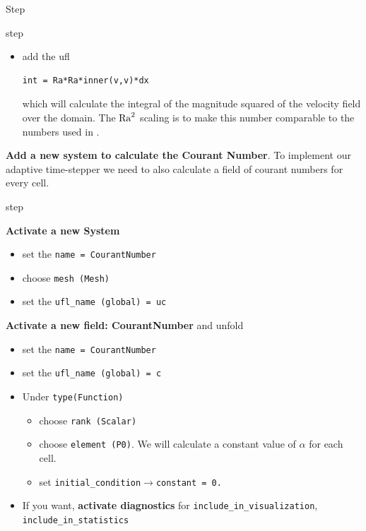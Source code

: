\begin{steps}{Step}
\begin{steps}{step}
\begin{itemize}
\begin{itemize}
      \item add the ufl
       \begin{lstlisting}[style=UFL]
int = Ra*Ra*inner(v,v)*dx
       \end{lstlisting}
 which will calculate the integral of the magnitude squared of the velocity
 field over the domain.  The $\mathrm{Ra}^{2}$ scaling is to make this number
 comparable to the numbers used in \cite{blankenbach_benchmark_1989}.
      \end{itemize}
    \end{itemize}
\end{steps}
  \item \textbf{Add a new system to calculate the Courant Number}.  To
    implement our adaptive time-stepper we need to also calculate a
    field of courant numbers for every cell.
    \begin{steps}{step}
    \item \textbf{Activate a new System} 
      \begin{itemize}
      \item set the \texttt{name = CourantNumber}
      \item choose \texttt{mesh (Mesh)}
      \item set the \texttt{ufl\_name (global) = uc}
      \end{itemize}
    \item \textbf{Activate a new field: CourantNumber} and unfold
     \begin{itemize}
      \item set the \texttt{name = CourantNumber}
      \item set the \texttt{ufl\_name (global) = c}
      \item Under \texttt{type(Function)}
        \begin{itemize}
        \item choose \texttt{rank (Scalar)}
        \item choose \texttt{element (P0)}. We will calculate a
          constant value of $\alpha$ for each cell.
        \item set \texttt{initial\_condition}$\rightarrow$\texttt{constant = 0.}
        \end{itemize}
      \item If you want, \textbf{activate diagnostics} for
        \texttt{include\_in\_visualization}, \texttt{include\_in\_statistics}
      \end{itemize}
      

\end{steps}
\end{steps}
